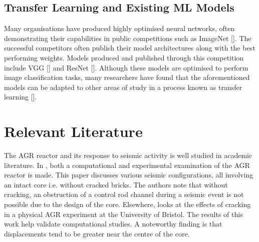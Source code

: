 \subsection{Transfer Learning and Existing ML Models} \label{transfer}

Many organisations have produced highly optimised neural networks, often demonstrating their capabilities in public competitions such as ImageNet [\cite{russakovsky2015imagenet}]. The successful competitors often publish their model architectures along with the best performing weights. Models produced and published through this competition include VGG [\cite{simonyan2014very}] and ResNet [\cite{he2015deep}]. Although these models are optimised to perform image classification tasks, many researchers have found that the aforementioned models can be adapted to other areas of study in a process known as transfer learning [\cite{tan2018survey}].

\section{Relevant Literature}

The AGR reactor and its response to seismic activity is well studied in academic literature. In \cite{voyagaki2018earthquake}, both a computational and experimental examination of the AGR reactor is made. This paper discusses various seismic configurations, all involving an intact core i.e. without cracked bricks. The authors note that without cracking, an obstruction of a control rod channel during a seismic event is not possible due to the design of the core. Elsewhere, \cite{oddbjornsson2017physical} looks at the effects of cracking in a physical AGR experiment at the University of Bristol. The results of this work help validate computational studies. A noteworthy finding is that displacements tend to be greater near the centre of the core.